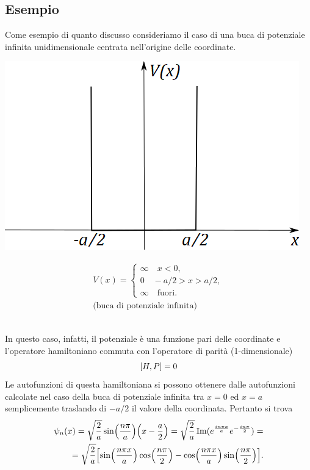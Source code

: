 \subsection*{Esempio}
Come esempio di quanto discusso consideriamo il caso di una buca di potenziale infinita unidimensionale centrata nell'origine delle coordinate.\\
\begin{minipage}{.4\textwidth}
\includegraphics[width=\textwidth]{immagini/cap_9/fig_9_1.png}	
\end{minipage}
\begin{minipage}{.55\textwidth}
\begin{align}
V(x)= 
\begin{cases}
\infty \quad x<0,\\
0 \quad -a/2>x>a/2, \\
\infty \quad \textrm{fuori}.
\end{cases}
\\
\textrm{(buca di potenziale infinita)} \nonumber
\end{align}
\end{minipage}\\
In questo caso, infatti, il potenziale è una funzione pari delle coordinate e l'operatore hamiltoniano commuta con l'operatore di parità (1-dimensionale)
\begin{equation}
  \comm {H}{P}= 0
\end{equation}
Le autofunzioni di questa hamiltoniana si possono ottenere dalle autofunzioni calcolate nel caso della buca di potenziale infinita tra $x=0$ ed $x=a$ semplicemente traslando di $-a/2$ il valore della coordinata. Pertanto si trova
\begin{align}
  \psi_n(x) = \sqrt{\frac{2}{a}}\sin(\frac{n\pi}{a})\qty(x-\frac{a}{2})= \sqrt{\frac{2}{a}}\Im(e^{\frac{in\pi x}{a}}e^{-\frac{in\pi}{2}})=\nonumber\\
  =\sqrt{\frac{2}{a}}\qty[\sin(\frac{n\pi x}{a})\cos(\frac{n\pi}{2})-\cos(\frac{n\pi x}{a})\sin(\frac{n\pi}{2})] .
\end{align}
